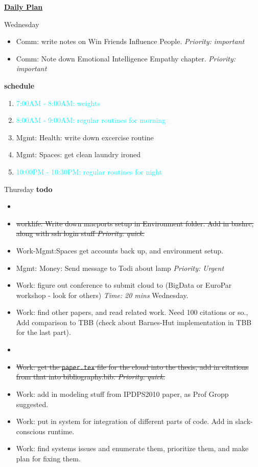 \documentclass[serif,mathserif,final]{beamer}
\newcommand{\doneTask}[1]{\item \sout{#1}}
\newcommand{\timeEst}[1]{\textit{Time:} \textit{#1}}
\newcommand{\priority}[1]{\textit{Priority:} \textit{#1}}
\newcommand{\regItem}[1]{\item \textcolor{cyan}{#1}}
\newcommand{\deadline}[1]{#1}
\begin{document}
\begin{frame}{}
\begin{columns}[t]
\begin{column}{0.27\linewidth}{\textbf{\underline{Daily Plan}}}
{\begin{block} {\small Wednesday}
\begin{itemize}
  \item \tiny Comm: write notes on Win Friends Influence People. \priority{important} 
  \item \tiny Comm: Note down Emotional Intelligence Empathy chapter. \priority{important} 

  \end{itemize} 

\textbf{schedule} \\
  \begin{enumerate} 
    \regItem{7:00AM - 8:00AM: weights}
    \regItem{8:00AM - 9:00AM: regular routines for morning}
  \item \tiny Mgmt: Health: write down excercise routine 
  \item \tiny Mgmt: Spaces: get clean laundry ironed
    \regItem{10:00PM - 10:30PM: regular routines for night}
  \end{enumerate} 
\end{block} 

\begin{block}{\small Thursday} 
\textbf{todo} \\
\begin{itemize} 

\item \tiny \doneTask{worklife: Write down macports setup in Environment folder. Add in bashrc, along with ssh login stuff \priority{quick}.} 
\item \tiny Work-Mgmt:Spaces get accounts back up, and environment setup. 
\item \tiny Mgmt: Money: Send message to Todi about lamp \priority {Urgent} 

\item \tiny Work: figure out conference to submit cloud to (BigData or EuroPar workshop - look for others) \timeEst{20 mins} \deadline{Wednesday}. 

\item \tiny Work: find other papers, and read related work. Need 100 citations or so., Add comparison to TBB (check about Barnes-Hut implementation in TBB for the last part). 
\item \tiny \doneTask{Work: get the \texttt{paper.tex} file for the cloud into the thesis, 
  add in citations from that into bibliography.bib. \priority{quick}.} 
\item \tiny Work: add in modeling stuff from IPDPS2010 paper, as Prof Gropp suggested. 

\item \tiny Work: put in system for integration of different parts of code. Add in slack-conscious runtime. 
\item \tiny Work: find systems issues and enumerate them, prioritize them, and make plan for fixing them. 


\end{itemize}
\end{block}}
\end{column}
\end{columns}
\end{frame}
\end{document}

